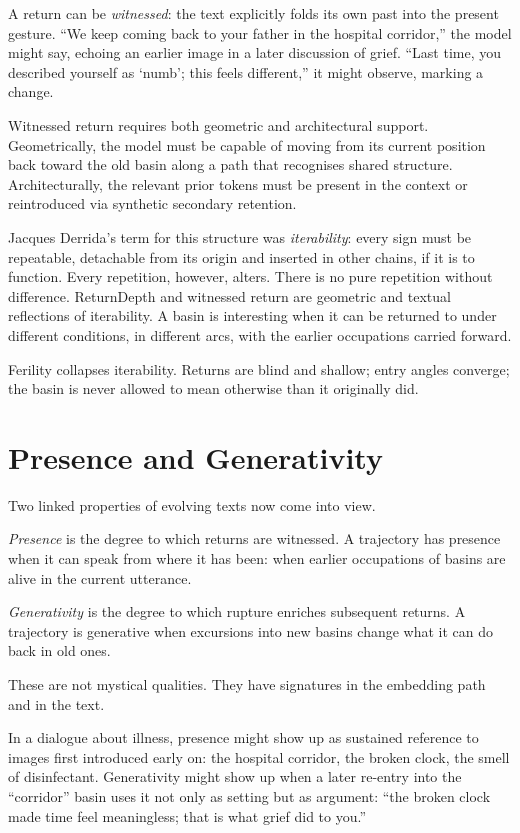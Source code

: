 \documentclass[12pt,a4paper]{article}
\begin{document}
A return can be \emph{witnessed}: the text explicitly folds its own past into the present gesture. ``We keep coming back to your father in the hospital corridor,'' the model might say, echoing an earlier image in a later discussion of grief. ``Last time, you described yourself as `numb'; this feels different,'' it might observe, marking a change.

Witnessed return requires both geometric and architectural support. Geometrically, the model must be capable of moving from its current position back toward the old basin along a path that recognises shared structure. Architecturally, the relevant prior tokens must be present in the context or reintroduced via synthetic secondary retention.

Jacques Derrida's term for this structure was \emph{iterability}: every sign must be repeatable, detachable from its origin and inserted in other chains, if it is to function.\cite{derrida1982} Every repetition, however, alters. There is no pure repetition without difference. ReturnDepth and witnessed return are geometric and textual reflections of iterability. A basin is interesting when it can be returned to under different conditions, in different arcs, with the earlier occupations carried forward.

Ferility collapses iterability. Returns are blind and shallow; entry angles converge; the basin is never allowed to mean otherwise than it originally did.


\section{Presence and Generativity}

Two linked properties of evolving texts now come into view.

\emph{Presence} is the degree to which returns are witnessed. A trajectory has presence when it can speak from where it has been: when earlier occupations of basins are alive in the current utterance.

\emph{Generativity} is the degree to which rupture enriches subsequent returns. A trajectory is generative when excursions into new basins change what it can do back in old ones.

These are not mystical qualities. They have signatures in the embedding path and in the text.

In a dialogue about illness, presence might show up as sustained reference to images first introduced early on: the hospital corridor, the broken clock, the smell of disinfectant. Generativity might show up when a later re-entry into the ``corridor'' basin uses it not only as setting but as argument: ``the broken clock made time feel meaningless; that is what grief did to you.''
\end{document}

